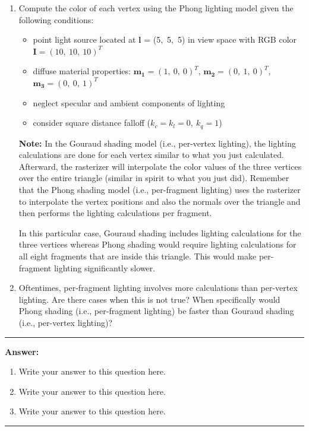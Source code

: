 \documentclass[conference]{styles/acmsiggraph}
\renewcommand{\vec}[1]{\mathbf{#1}}
\newenvironment{answer}{}{}
\newcommand{\points}[1]{\hfill \normalfont{(\textit{#1pts})}}
\begin{document}
\begin{enumerate}[label=(\roman*)]
\item Compute the color of each vertex using the Phong lighting model given the following conditions: \points{10}
\begin{itemize}
\item point light source located at $\vec{l}$ = (5,\ 5,\ 5) in view space with RGB color $\vec{I} = (10,\ 10,\ 10)^T$
\item diffuse material properties: $\vec{m_{1}} = (1,\ 0,\ 0)^T$, $\vec{m_{2}} = (0,\ 1,\ 0)^T$, $\vec{m_{3}} = (0,\ 0,\ 1)^T$
\item neglect specular and ambient components of lighting
\item consider square distance falloff ($k_c = k_l = 0,\ k_q = 1$)
\end{itemize}
\textbf{Note: } In the Gouraud shading model (i.e., per-vertex lighting), the lighting calculations are done for each vertex similar to what you just calculated. Afterward, the rasterizer will interpolate the color values of the three vertices over the entire triangle (similar in spirit to what you just did). Remember that the Phong shading model (i.e., per-fragment lighting) uses the rasterizer to interpolate the vertex positions and also the normals over the triangle and then performs the lighting calculations per fragment.

In this particular case, Gouraud shading includes lighting calculations for the three vertices whereas Phong shading would require lighting calculations for all eight fragments that are inside this triangle. This would make per-fragment lighting significantly slower.

\item Oftentimes, per-fragment lighting involves more calculations than per-vertex lighting. Are there cases when this is not true? When specifically would Phong shading (i.e., per-fragment lighting) be faster than Gouraud shading (i.e., per-vertex lighting)? \points{5}

\end{enumerate}


\begin{answer}
\rule{\textwidth}{0.4pt}
	\textbf{Answer:}
	\begin{enumerate}[label=(\roman*)]
		\item Write your answer to this question here.
		\item Write your answer to this question here.
		\item Write your answer to this question here.
	\end{enumerate}
\rule{\textwidth}{0.4pt}
\end{answer}
\end{document}
